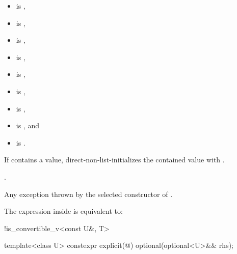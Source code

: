 \begin{itemdescr}
\pnum
\constraints
\begin{itemize}
\item {} is ,
\item {} is ,
\item {} is ,
\item {} is ,
\item {} is ,
\item {} is ,
\item {} is ,
\item {} is , and
\item {} is .
\end{itemize}

\pnum
\effects
If  contains a value,
direct-non-list-initializes the contained value with .

\pnum
\ensures
{}.

\pnum
\throws
Any exception thrown by the selected constructor of .

\pnum
\remarks
The expression inside  is equivalent to:
\begin{codeblock}
!is_convertible_v<const U&, T>
\end{codeblock}
\end{itemdescr}

%
\begin{itemdecl}
template<class U> constexpr explicit(@\seebelow@) optional(optional<U>&& rhs);
\end{itemdecl}

